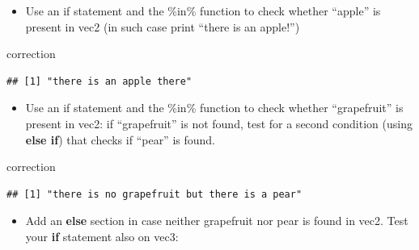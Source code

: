 \documentclass[]{book}
\newenvironment{Shaded}{\begin{snugshade}}{\end{snugshade}}
\newcommand{\ControlFlowTok}[1]{\textcolor[rgb]{0.13,0.29,0.53}{\textbf{#1}}}
\newcommand{\KeywordTok}[1]{\textcolor[rgb]{0.13,0.29,0.53}{\textbf{#1}}}
\newcommand{\NormalTok}[1]{#1}
\newcommand{\OperatorTok}[1]{\textcolor[rgb]{0.81,0.36,0.00}{\textbf{#1}}}
\newcommand{\StringTok}[1]{\textcolor[rgb]{0.31,0.60,0.02}{#1}}
\providecommand{\tightlist}{%
  \setlength{\itemsep}{0pt}\setlength{\parskip}{0pt}}
\begin{document}
\begin{itemize}
\tightlist
\item
  Use an if statement and the \%in\% function to check whether ``apple'' is present in vec2 (in such case print ``there is an apple!'')
\end{itemize}

correction

\begin{Shaded}
\end{Shaded}

\begin{verbatim}
## [1] "there is an apple there"
\end{verbatim}

\begin{itemize}
\tightlist
\item
  Use an if statement and the \%in\% function to check whether ``grapefruit'' is present in vec2: if ``grapefruit'' is not found, test for a second condition (using \textbf{else if}) that checks if ``pear'' is found.
\end{itemize}

correction

\begin{Shaded}
\end{Shaded}

\begin{verbatim}
## [1] "there is no grapefruit but there is a pear"
\end{verbatim}

\begin{itemize}
\tightlist
\item
  Add an \textbf{else} section in case neither grapefruit nor pear is found in vec2.
  Test your \textbf{if} statement also on vec3:
\end{itemize}
\end{document}
